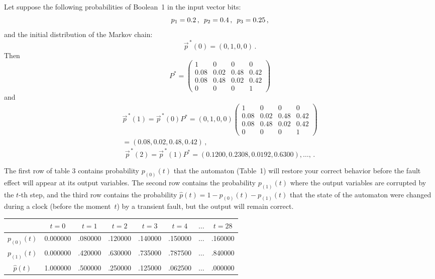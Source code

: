 \begin{multicols}{2}
Let suppose the following probabilities of Boolean~1
in the input vector bits:
$$
p_1=0{.}2\,,\enskip
p_2=0{.}4\,,\enskip
p_3=0{.}25\,,
$$
and the initial distribution of the Markov chain:
$$
\vec p^{\,*}(0) = (0,1,0,0)\,.
$$
Then
$$
P^*
=
\begin{pmatrix}
1      &   0    &   0    &   0       \\
0{.}08 & 0{.}02 & 0{.}48 &  0{.}42   \\
0{.}08 & 0{.}48 & 0{.}02 &  0{.}42   \\
0      &   0    & 0      &   1       
\end{pmatrix}
$$
and
\begin{multline*}
\vec p^{\,*}(1)
=
\vec p^{\,*}(0) P^*
=
(0,1,0,0)
\begin{pmatrix}
1      &   0    &   0    &   0       \\
0{.}08 & 0{.}02 & 0{.}48 &  0{.}42   \\
0{.}08 & 0{.}48 & 0{.}02 &  0{.}42   \\
0      &   0    & 0      &   1       
\end{pmatrix}\\
{}= (0{.}08,0{.}02,0{.}48,0{.}42)\,,
\end{multline*}
$$
\vec p^{\,*}(2)
=
\vec p^{\,*}(1) P^*
=
(0{.}1200,0{.}2308,0{.}0192,0{.}6300),\ldots ,\,.
$$

The  first row of table 3 contains  probability
$p_{(0)}(t)$ that the automaton (Table~1) will restore your
correct behavior before the fault effect will appear
at its output variables.
The second row contains the probability $p_{(1)}(t)$
where the output variables are corrupted by the
$t$-th step, and the third row contains the probability
$\hat p(t)=1-p_{(0)}(t)-p_{(1)}(t)$
that the state of the automaton were changed during a clock
(before the moment~$t$) by a transient fault,
but the output will remain correct.

\begin{table*}\small
\begin{center}
\Caption{\
}

\begin{tabular}{cccccccc}
\hline
       & $t=0$ & $t=1$ & $t=2$ & $t=3$ & $t=4$ & $\ldots$ & $t=28$  \\
\hline
$p_{(0)}(t)$
       & 0.000000 & .080000 & .120000 & .140000 & .150000
                      & $\ldots$ & .160000 \\
\hline
$p_{(1)}(t)$
       & 0.000000 & .420000 & .630000 & .735000 & .787500
                      & $\ldots$ & .840000 \\
\hline
$\hat p(t)$
       & 1.000000 & .500000 & .250000 & .125000 & .062500
                      & $\ldots$ & .000000 \\
\hline
\end{tabular}
\end{center}
\end{table*}


\end{multicols}
